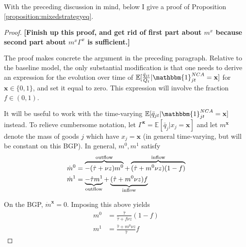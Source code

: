 \documentclass[11pt,english]{article}
\begin{document}
With the preceding discussion in mind, below I give a proof of Proposition \ref{proposition:mixedstrategyeq}.

\begin{proof}
	\textbf{[Finish up this proof, and get rid of first part about $m^x$ because second part about $m^x \Gamma^x$ is sufficient.]}
	
	The proof makes concrete the argument in the preceding paragraph. Relative to the baseline model, the only substantial modification is that one needs to derive an expression for the evolution over time of $\mathbb{E}[\frac{\bar{q}_{jt}}{Q_t} | \mathbbm{1}^{NCA}_{jt} = \mathbf{x}]$ for $\mathbf{x} \in \{0,1\}$, and set it equal to zero. This expression will involve the fraction $f \in (0,1)$. 
	
	It will be useful to work with the time-varying $\mathbb{E}[\bar{q}_{jt} | \mathbbm{1}^{NCA}_{jt} = \mathbf{x}]$ instead. To relieve cumbersome notation, let $\Gamma^{\mathbf{x}} = \mathbb{E}[\bar{q}_j | x_j = \mathbf{x}]$ and let $m^{\mathbf{x}}$ denote the mass of goods $j$ which have $x_j = \mathbf{x}$ (in general time-varying, but will be constant on this BGP). In general, $m^0,m^1$ satisfy
	\begin{align}
		\dot{m}^0 &= \overbrace{-(\hat{\tau} + \nu z) m^0}^{\mathclap{\text{outflow}}} + \overbrace{(\hat{\tau} + m^0 \nu z) (1-f)}^{\mathclap{\text{inflow}}}\\
		\dot{m}^1 &= \underbrace{-\hat{\tau} m^1 }_{\mathclap{\text{outflow}}} + \underbrace{(\hat{\tau} + m^0 \nu z) f}_{\mathclap{\text{inflow}}}
	\end{align}
	
	On the BGP, $\dot{m}^{\mathbf{x}} = 0$. Imposing this above yields
	\begin{align}
		m^0 &= \frac{\hat{\tau}}{\hat{\tau} + f \nu z} (1-f)   \label{appendix:model:mixedstrategyeq:m0}\\
		m^1 &= \frac{\hat{\tau} + m^0 \nu z}{\hat{\tau}} f   \label{appendix:model:mixedstrategyeq:m1}
	\end{align}
	

\end{proof}
\end{document}
